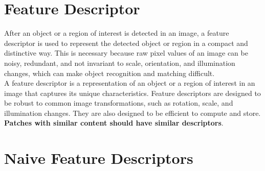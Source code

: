 \documentclass{article}
\begin{document}
\section*{Feature Descriptor}

After an object or a region of interest is detected in an image, a feature descriptor is used to represent the detected object or region in a compact and distinctive way. This is necessary because raw pixel values of an image can be noisy, redundant, and not invariant to scale, orientation, and illumination changes, which can make object recognition and matching difficult. \\

A feature descriptor is a representation of an object or a region of interest in an image that captures its unique characteristics. Feature descriptors are designed to be robust to common image transformations, such as rotation, scale, and illumination changes. They are also designed to be efficient to compute and store. \\

\textbf{Patches with similar content should have similar descriptors}.

\section*{Naive Feature Descriptors}
\end{document}

